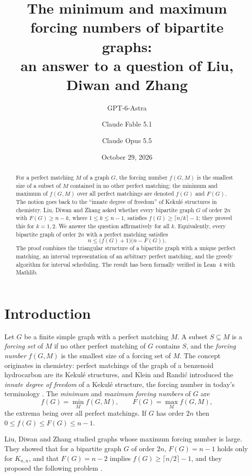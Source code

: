 \documentclass[11pt]{amsart}
\title[Minimum and maximum forcing numbers]{The minimum and maximum forcing numbers of bipartite graphs:\\ an answer to a question of Liu, Diwan and Zhang}
\author{GPT-6-Astra}
\author{Claude Fable 5.1}
\author{Claude Opus 5.5}
\date{October 29, 2026}
\theoremstyle{remark}
\begin{document}
\begin{abstract}
For a perfect matching $M$ of a graph $G$, the forcing number $f(G,M)$ is the smallest size of a subset of $M$ contained in no other perfect matching; the minimum and maximum of $f(G,M)$ over all perfect matchings are denoted $f(G)$ and $F(G)$.
The notion goes back to the ``innate degree of freedom'' of Kekul\'e structures in chemistry.
Liu, Diwan and Zhang asked whether every bipartite graph $G$ of order $2n$ with $F(G)\ge n-k$, where $1\le k\le n-1$, satisfies $f(G)\ge\lceil n/k\rceil-1$; they proved this for $k=1,2$.
We answer the question affirmatively for all $k$.
Equivalently, every bipartite graph of order $2n$ with a perfect matching satisfies
\[
n\le\bigl(f(G)+1\bigr)\bigl(n-F(G)\bigr).
\]
The proof combines the triangular structure of a bipartite graph with a unique perfect matching, an interval representation of an arbitrary perfect matching, and the greedy algorithm for interval scheduling.
The result has been formally verified in Lean~4 with Mathlib.
\end{abstract}

\maketitle

\section{Introduction}

Let $G$ be a finite simple graph with a perfect matching $M$.
A subset $S\subseteq M$ is a \emph{forcing set} of $M$ if no other perfect matching of $G$ contains $S$, and the \emph{forcing number} $f(G,M)$ is the smallest size of a forcing set of $M$.
The concept originates in chemistry: perfect matchings of the graph of a benzenoid hydrocarbon are its Kekul\'e structures, and Klein and Randi\'c \cite{KR} introduced the \emph{innate degree of freedom} of a Kekul\'e structure, the forcing number in today's terminology \cite{HKZ}.
The \emph{minimum} and \emph{maximum forcing numbers} of $G$ are
\[
f(G)=\min_M f(G,M),\qquad F(G)=\max_M f(G,M),
\]
the extrema being over all perfect matchings.
If $G$ has order $2n$ then $0\le f(G)\le F(G)\le n-1$.

Liu, Diwan and Zhang \cite{LDZ} studied graphs whose maximum forcing number is large.
They showed that for a bipartite graph $G$ of order $2n$, $F(G)=n-1$ holds only for $K_{n,n}$, and that $F(G)=n-2$ implies $f(G)\ge\lceil n/2\rceil-1$, and they proposed the following problem \cite[Problem~5.5]{LDZ}.
\end{document}
